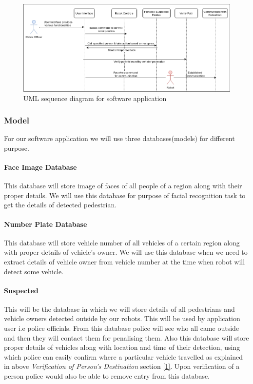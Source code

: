 \documentclass[10pt,twocolumn,letterpaper]{article}
\begin{document}
\begin{figure}
  \includegraphics[width=\textwidth]{sequence.png}
  \caption{UML sequence diagram for software application}
\end{figure}

\subsubsection{Model}
For our software application we will use three databases(models) for different purpose.
\paragraph{Face Image Database}
This database will store image of faces of all people of a region along with their proper details. We will use this database for purpose of facial recognition task to get the details of detected pedestrian.
\paragraph{Number Plate Database}
This database will store vehicle number of all vehicles of a certain region along with proper details of vehicle's owner. We will use this database when we need to extract details of vehicle owner from vehicle number at the time when robot will detect some vehicle.

\paragraph{Suspected}
This will be the database in which we will store details of all pedestrians and vehicle owners detected outside by our robots. This will be used by application user i.e police officials. From this database police will see who all came outside and then they will contact them for penalising them. Also this database will store proper details of vehicles along with location and time of their detection, using which police can easily confirm where a particular vehicle travelled as explained in above \emph{Verification of Person's Destination} section \hyperref[sec:ver]{[1]}. Upon verification of a person police would also be able to remove entry from this database.
\end{document}
